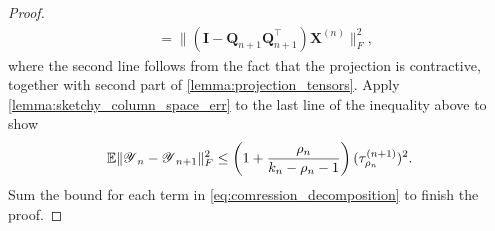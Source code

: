 \begin{lem}
\begin{proof}
\begin{equation}
\begin{aligned}
&= \| (\mathbf{I} - \mathbf{Q}_{n+1}\mathbf{Q}_{n+1}^\top)\mathbf{X}^{(n)}\|_F^2,
\end{aligned}
\end{equation}
where the second line follows from the fact that the projection is contractive,
together with second part of \ref{lemma:projection_tensors}.
Apply \ref{lemma:sketchy_column_space_err} to the last line of the inequality above to show
\begin{equation}
\mathbb{E} \|\T{Y}_n - \T{Y}_{n+1}\|_F^2 \le \left(1+\frac{\rho_n}{k_n-\rho_n-1}\right)(\tau^{(n+1)}_{\rho_n})^2.\nonumber
\end{equation}
Sum the bound for each term in  \eqref{eq:comression_decomposition} to finish the proof.
\end{proof}
\end{lem}
